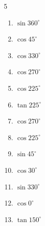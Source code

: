 \begin{multicols}{5}
\begin{enumerate}
  \item $\displaystyle \sin{360^\circ}$

        \phantom{$\displaystyle =0$}

  \item $\displaystyle \cos{45^\circ}$


  \item $\displaystyle \cos{330^\circ}$


  \item $\displaystyle \cos{270^\circ}$

        \phantom{$\displaystyle =0$}

  \item $\displaystyle \cos{225^\circ}$


  \item $\displaystyle \tan{225^\circ}$

        \phantom{$\displaystyle =1$}

  \item $\displaystyle \cos{270^\circ}$

        \phantom{$\displaystyle =0$}

  \item $\displaystyle \cos{225^\circ}$


  \item $\displaystyle \sin{45^\circ}$


  \item $\displaystyle \cos{30^\circ}$


\columnbreak %

  \item $\displaystyle \sin{330^\circ}$


  \item $\displaystyle \cos{0^\circ}$

        \phantom{$\displaystyle =1$}

  \item $\displaystyle \tan{150^\circ}$


\end{enumerate}
\end{multicols}
